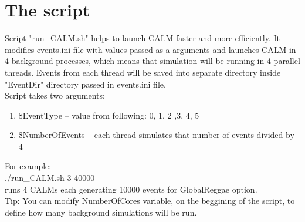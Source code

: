 \newpage
\section{The script}
Script "run\_CALM.sh" helps to launch CALM faster and more efficiently. It modifies events.ini file with values passed as a arguments and launches CALM in 4 background processes, which means that simulation will be running in 4 parallel threads. Events from each thread will be saved into separate directory inside "EventDir" directory passed in events.ini file.\\
Script takes two arguments:
\begin{enumerate}
    \item \$EventType -- value from following: 0, 1, 2 ,3, 4, 5
    \item \$NumberOfEvents -- each thread simulates that number of events divided by 4
\end{enumerate}
For example:\\\tab ./run\_CALM.sh 3 40000\\
runs 4 CALMs each generating 10000 events for GlobalReggae option.\\

Tip: You can modify NumberOfCores variable, on the beggining of the script, to define how many background simulations will be run.